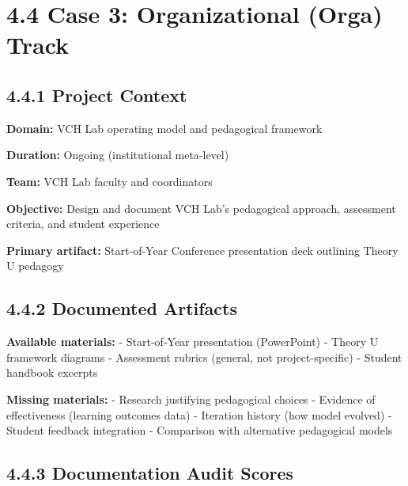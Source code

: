 \documentclass[
  oneside,
  open=any]{scrbook}
\begin{document}
\section{4.4 Case 3: Organizational (Orga)
Track}\label{case-3-organizational-orga-track}

\subsection{4.4.1 Project Context}\label{project-context-2}

\textbf{Domain:} VCH Lab operating model and pedagogical framework

\textbf{Duration:} Ongoing (institutional meta-level)

\textbf{Team:} VCH Lab faculty and coordinators

\textbf{Objective:} Design and document VCH Lab's pedagogical approach,
assessment criteria, and student experience

\textbf{Primary artifact:} Start-of-Year Conference presentation deck
outlining Theory U pedagogy

\subsection{4.4.2 Documented Artifacts}\label{documented-artifacts-2}

\textbf{Available materials:} - Start-of-Year presentation (PowerPoint)
- Theory U framework diagrams - Assessment rubrics (general, not
project-specific) - Student handbook excerpts

\textbf{Missing materials:} - Research justifying pedagogical choices -
Evidence of effectiveness (learning outcomes data) - Iteration history
(how model evolved) - Student feedback integration - Comparison with
alternative pedagogical models

\subsection{4.4.3 Documentation Audit
Scores}\label{documentation-audit-scores-2}
\end{document}
